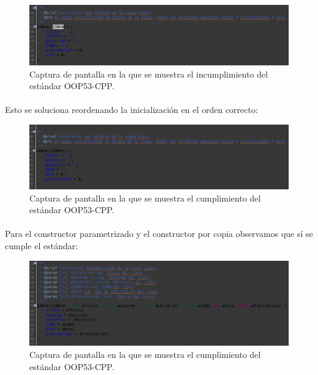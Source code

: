 			\begin{figure}[H]
				\centering
				\includegraphics[scale=0.5]{img/captura13.png}
				\caption{Captura de pantalla en la que se muestra el incumplimiento del estándar OOP53-CPP.}
				\label{captura13}
			\end{figure}
		
			\paragraph{}Esto se soluciona reordenando la inicialización en el orden correcto:
			
			\begin{figure}[H]
				\centering
				\includegraphics[scale=0.5]{img/captura14.png}
				\caption{Captura de pantalla en la que se muestra el cumplimiento del estándar OOP53-CPP.}
				\label{captura14}
			\end{figure}
		
			\paragraph{}Para el constructor parametrizado y el constructor por copia observamos que sí se cumple el estándar:
			
			\begin{figure}[H]
				\centering
				\includegraphics[scale=0.5]{img/captura15.png}
				\caption{Captura de pantalla en la que se muestra el cumplimiento del estándar OOP53-CPP.}
				\label{captura15}
			\end{figure}
		

